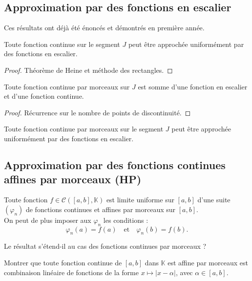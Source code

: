 \documentclass[french]{article}
\newcommand{\K}{\mathbb{K}}
\theoremstyle{plain}
\theoremstyle{definition}
\theoremstyle{remark}
\begin{document}
\subsection{Approximation par des fonctions en escalier}

Ces résultats ont déjà été énoncés et démontrés en première année.

\begin{prop}%
	Toute fonction continue sur le segment $J$ peut être approchée uniformément par des fonctions en escalier.
\end{prop}
\begin{proof}
	Théorème de Heine et méthode des rectangles.
\end{proof}

\begin{lem}%
	Toute fonction continue par morceaux sur $J$ est somme d'une fonction en escalier et d'une fonction continue.
\end{lem}
\begin{proof}
	Récurrence sur le nombre de points de discontinuité.
\end{proof}

\begin{thm}%
	Toute fonction continue par morceaux sur le segment $J$ peut être approchée uniformément par des fonctions en escalier.
\end{thm}

\subsection{Approximation par des fonctions continues affines par morceaux (HP)}

\begin{prop}%
	Toute fonction $f\in\mathcal{C}([a,b],\K)$ est limite uniforme sur $[a,b]$ d'une suite $(\varphi_n)$ de fonctions continues et affines par morceaux sur $[a,b]$.\\
	On peut de plus imposer aux $\varphi_n$ les conditions :
	$$\varphi_n(a)=f(a)\quad\text{et}\quad\varphi_n(b)=f(b).$$
\end{prop}

\begin{exo}
	Le résultat s'étend-il au cas des fonctions continues par morceaux ? %
\end{exo}

\begin{exo}
	Montrer que toute fonction continue de $[a,b]$ dans $\K$ est affine par morceaux est combinaison linéaire de fonctions de la forme $x\mapsto \lvert x-\alpha\rvert$, avec $\alpha\in[a,b]$.
\end{exo}
\end{document}
